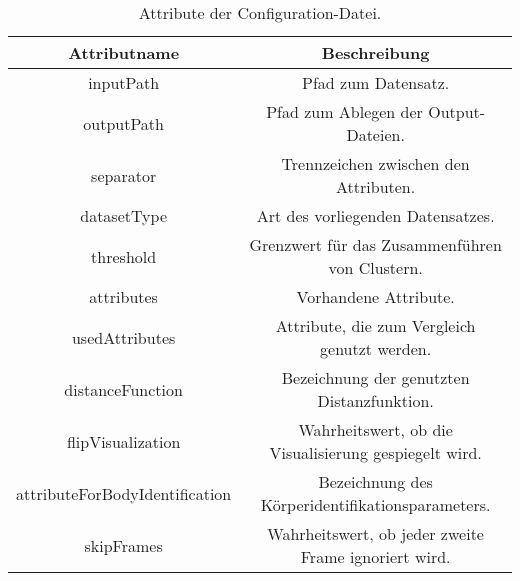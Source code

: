 \begin{table}[ht]
    \begin{center}
        \begin{tabular}{ |c|c| } 
            \hline
            Attributname & Beschreibung \\
            \hline \hline
            inputPath & Pfad zum Datensatz. \\
            \hline
            outputPath & Pfad zum Ablegen der Output-Dateien.  \\
            \hline
            separator & Trennzeichen zwischen den Attributen. \\
            \hline
            datasetType & Art des vorliegenden Datensatzes. \\
            \hline
            threshold & Grenzwert für das Zusammenführen von Clustern. \\
            \hline
            attributes & Vorhandene Attribute. \\
            \hline
            usedAttributes & Attribute, die zum Vergleich genutzt werden. \\
            \hline
            distanceFunction & Bezeichnung der genutzten Distanzfunktion. \\
            \hline
            flipVisualization & Wahrheitswert, ob die Visualisierung gespiegelt wird. \\
            \hline
            attributeForBodyIdentification & Bezeichnung des Körperidentifikationsparameters. \\
            \hline
            skipFrames & Wahrheitswert, ob jeder zweite Frame ignoriert wird. \\
            \hline
        \end{tabular}
        \caption{Attribute der Configuration-Datei.}
        \label{tbl:AttributesConfig}
    \end{center}
\end{table}

\clearpage
